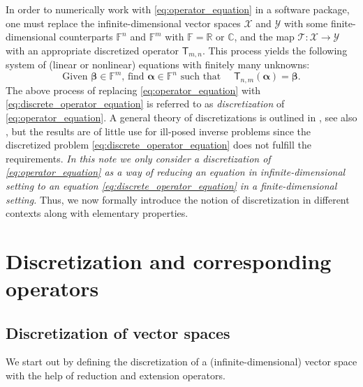 \documentclass[a4paper]{paper}
\newcommand{\Spc}[1]{\mathscr{#1}}
\newcommand{\Field}{\mathbb{F}}
\newcommand{\Real}{\mathbb{R}}
\newcommand{\Complex}{\mathbb{C}}
\newcommand{\Op}[1]{\mathcal{#1}}
\newcommand{\DiscOp}[1]{\mathsf{#1}}
\newcommand{\valpha}{\boldsymbol{\alpha}}
\newcommand{\vbeta}{\boldsymbol{\beta}}
\begin{document}
In order to numerically work with \eqref{eq:operator_equation} in a software package, one must replace the 
infinite-dimensional vector spaces $\Spc{X}$ and $\Spc{Y}$ with some finite-dimensional 
counterparts $\Field^{n}$ and $\Field^{m}$ with $\Field = \Real \text{ or } \Complex$, and the map 
$\Op{T} \colon \Spc{X} \to \Spc{Y}$ with an appropriate discretized operator 
$\DiscOp{T}_{m,n}$. This process yields the following system of (linear or nonlinear) equations
with finitely many unknowns:
%
\begin{equation}
 \label{eq:discrete_operator_equation}
 \text{Given $\vbeta \in \Field^{m}$, find $\valpha \in \Field^{n}$ such that }\quad \DiscOp{T}_{n,m} (\valpha)=\vbeta. 
\end{equation}
%
The above process of replacing \eqref{eq:operator_equation} with \eqref{eq:discrete_operator_equation} is referred to 
as \emph{discretization} of \eqref{eq:operator_equation}. A general theory of discretizations is outlined in 
\cite[Chapter~34]{ZeIIB85}, see also \cite{Pe93}, but the results are of little use for ill-posed inverse 
problems since the discretized problem \eqref{eq:discrete_operator_equation} does not fulfill the requirements.
\emph{In this note we only consider a discretization of \eqref{eq:operator_equation} 
as a way of reducing an equation in infinite-dimensional setting to an equation 
\eqref{eq:discrete_operator_equation} in a finite-dimensional setting.}
Thus, we now formally introduce the notion of discretization in different contexts along with elementary properties.


\section{Discretization and corresponding operators}
\label{sec:discretization_compatibility}

\subsection{Discretization of vector spaces}
\label{subsec:space_discretization}

We start out by defining the discretization of a (infinite-dimensional) vector space with the help of 
reduction and extension operators.
\end{document}
